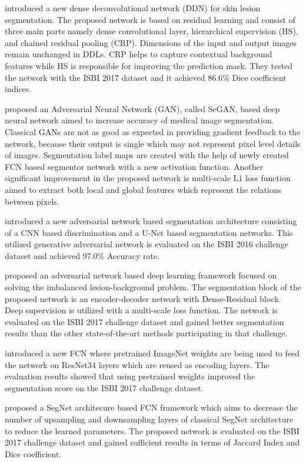    \citet{li2018dense} introduced a new dense deconvolutional network (DDN) for skin lesion segmentation.
    The proposed network is based on residual learning and consist of three main parts namely dense convolutional layer, hierarchical supervision (HS), and chained residual pooling (CRP).
    Dimensions of the input and output images remain unchanged in DDLs.
    CRP helps to capture contextual background features while HS is responsible for improving the prediction mask.
    They tested the network with the ISBI 2017 dataset and it achieved 86.6\% Dice coefficient indices.

    \citet{xue2018adversarial} proposed an Adversarial Neural Network (GAN), called SeGAN, based deep neural network aimed to increase accuracy of medical image segmentation.
    Classical GANs are not as good as expected in providing gradient feedback to the network, because their output is single which may not represent pixel level details of images.
    Segmentation label maps are created with the help of newly created FCN based segmentor network with a new activation function.
    Another significant improvement in the proposed network is multi-scale L1 loss function aimed to extract both local and global features which represent the relations between pixels.

    \citet{peng2019segmentation} introduced a new adversarial network based segmentation architecture consisting of a CNN based discrimination and a U-Net based segmentation networks.
    This utilized generative adversarial network is evaluated on the ISBI 2016 challenge dataset and achieved 97.0\% Accuracy rate.

    \citet{tu2019segmentation} proposed an adversarial network based deep learning framework focused on solving the imbalanced lesion-background problem.
    The segmentation block of the proposed network is an encoder-decoder network with Dense-Residual block. Deep supervision is utilized with a multi-scale loss function.
    The network is evaluated on the ISBI 2017 challenge dataset and gained better segmentation results than the other state-of-the-art methods participating in that challenge.

    \citet{tschandl2019domain} introduced a new FCN where pretrained ImageNet weights are being used to feed the network on ResNet34 layers which are reused as encoding layers.
    The evaluation results showed that using pretrained weights improved the segmentation score on the ISBI 2017 challenge dataset.

    \citet{ninh2019skin} proposed a SegNet architecure based FCN framework
    which aims to decrease the number of upsampling and downsampling layers of classical SegNet architecture to reduce the learned parameters.
    The proposed network is evaluated on the ISBI 2017 challenge dataset and gained sufficient results in terms of Jaccard Index and Dice coefficient.

